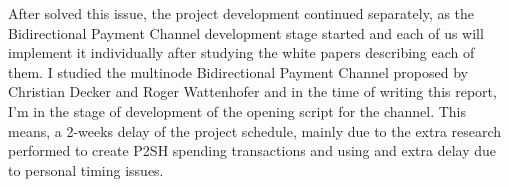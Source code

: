 After solved this issue, the project development continued separately, as the Bidirectional Payment Channel development stage started and each of us will implement it individually after studying the white papers describing each of them. I studied the multinode Bidirectional Payment Channel proposed by Christian Decker and Roger Wattenhofer \cite{decker2015fast} and in the time of writing this report, I'm in the stage of development of the opening script for the channel. This means, a 2-weeks delay of the project schedule, mainly due to the extra research performed to create P2SH spending transactions and using  and extra delay due to personal timing issues.